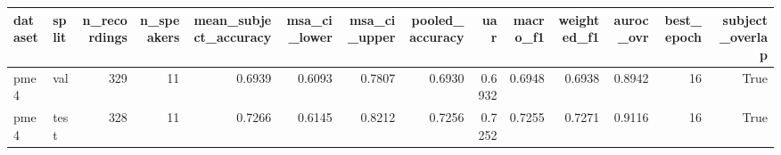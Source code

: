 \begin{tabular}{llrrrrrrrrrrrr}
\toprule
dataset & split & n_recordings & n_speakers & mean_subject_accuracy & msa_ci_lower & msa_ci_upper & pooled_accuracy & uar & macro_f1 & weighted_f1 & auroc_ovr & best_epoch & subject_overlap \\
\midrule
pme4 & val & 329 & 11 & 0.6939 & 0.6093 & 0.7807 & 0.6930 & 0.6932 & 0.6948 & 0.6938 & 0.8942 & 16 & True \\
pme4 & test & 328 & 11 & 0.7266 & 0.6145 & 0.8212 & 0.7256 & 0.7252 & 0.7255 & 0.7271 & 0.9116 & 16 & True \\
\bottomrule
\end{tabular}
